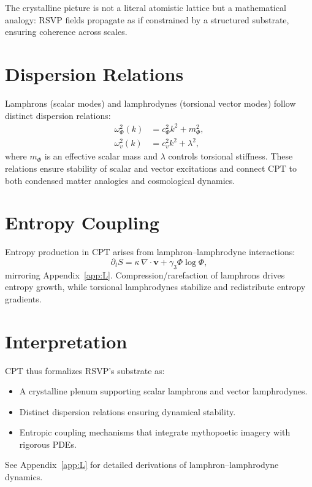 \documentclass[12pt]{report}
\begin{document}
The crystalline picture is not a literal atomistic lattice but a mathematical analogy: RSVP fields propagate as if constrained by a structured substrate, ensuring coherence across scales.

\section{Dispersion Relations}

Lamphrons (scalar modes) and lamphrodynes (torsional vector modes) follow distinct dispersion relations:
\begin{align}
\omega_\Phi^2(k) &= c_\Phi^2 k^2 + m_\Phi^2, \\
\omega_v^2(k) &= c_v^2 k^2 + \lambda^2,
\end{align}
where $m_\Phi$ is an effective scalar mass and $\lambda$ controls torsional stiffness.  
These relations ensure stability of scalar and vector excitations and connect CPT to both condensed matter analogies and cosmological dynamics.

\section{Entropy Coupling}

Entropy production in CPT arises from lamphron--lamphrodyne interactions:
\begin{equation}
\partial_t S = \kappa \, \nabla \cdot \mathbf{v} + \gamma_3 \Phi \log \Phi,
\end{equation}
mirroring Appendix~\ref{app:L}.  
Compression/rarefaction of lamphrons drives entropy growth, while torsional lamphrodynes stabilize and redistribute entropy gradients.

\section{Interpretation}

CPT thus formalizes RSVP’s substrate as:
\begin{itemize}
    \item A crystalline plenum supporting scalar lamphrons and vector lamphrodynes.
    \item Distinct dispersion relations ensuring dynamical stability.
    \item Entropic coupling mechanisms that integrate mythopoetic imagery with rigorous PDEs.
\end{itemize}

See Appendix~\ref{app:L} for detailed derivations of lamphron--lamphrodyne dynamics.
\end{document}
